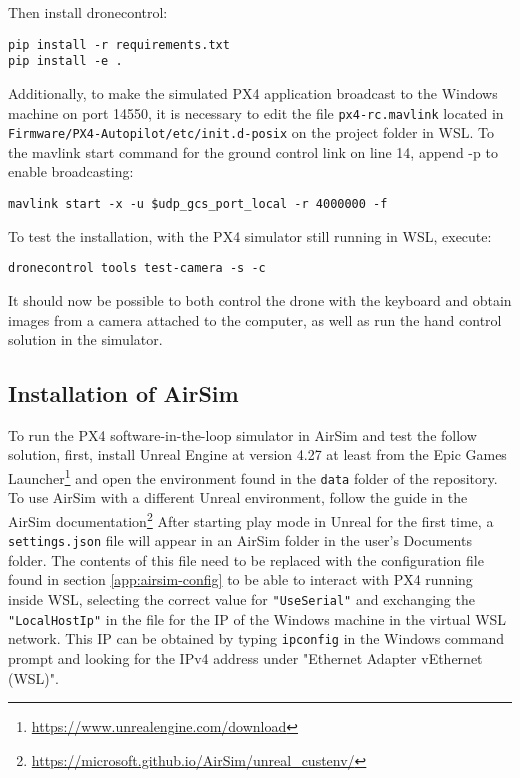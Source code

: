 Then install dronecontrol:
\begin{verbatim}
pip install -r requirements.txt
pip install -e .
\end{verbatim}

Additionally, to make the simulated PX4 application broadcast to the Windows machine on port 14550, it is necessary to edit the file \texttt{px4-rc.mavlink} located in \texttt{Firmware/PX4-Autopilot/etc/init.d-posix} on the project folder in WSL.
To the mavlink start command for the ground control link on line 14, append -p to enable broadcasting:
\begin{verbatim}
mavlink start -x -u $udp_gcs_port_local -r 4000000 -f
\end{verbatim}

To test the installation, with the PX4 simulator still running in WSL, execute:
\begin{verbatim}
dronecontrol tools test-camera -s -c
\end{verbatim}
It should now be possible to both control the drone with the keyboard and obtain images from a camera attached to the computer, as well as run the hand control solution in the simulator.

\subsection{Installation of AirSim}

To run the PX4 software-in-the-loop simulator in AirSim and test the follow solution,
first, install Unreal Engine at version 4.27 at least from the Epic Games Launcher\footnote{\url{https://www.unrealengine.com/download}} and open the environment found in the \texttt{data} folder of the repository.
To use AirSim with a different Unreal environment, follow the guide in the AirSim documentation\footnote{\url{https://microsoft.github.io/AirSim/unreal_custenv/}}
After starting play mode in Unreal for the first time, a \texttt{settings.json} file will appear in an AirSim folder in the user's Documents folder.
The contents of this file need to be replaced with the configuration file found in section \ref{app:airsim-config} to be able to interact with PX4 running inside WSL, selecting the correct value for \texttt{"UseSerial"} and exchanging the \texttt{"LocalHostIp"} in the file for the IP of the Windows machine in the virtual WSL network.
This IP can be obtained by typing \texttt{ipconfig} in the Windows command prompt and looking for the IPv4 address under "Ethernet Adapter vEthernet (WSL)".

